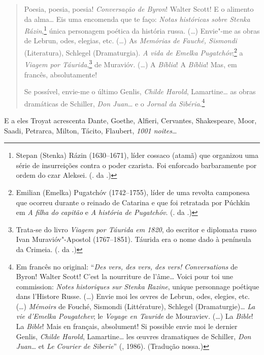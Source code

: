 \begin{quotation}
Poesia, poesia, poesia! \emph{Conversação de Byron}! Walter Scott! E o alimento da alma\ldots{} Eis uma encomenda que te faço: \emph{Notas históricas sobre Stenka Rázin},\footnote{Stepan (Stenka) Rázin (1630--1671), líder cossaco (atamã) que organizou uma série de insurreições contra o poder czarista. Foi enforcado barbaramente por ordem do czar Aleksei. (. da .)} única personagem poética da história russa. (\ldots{}) Envie"-me as obras de Lebrun, odes, elegias, etc. (\ldots{}) As \emph{Memórias de Fauché, Sismondi} (Literatura), Schlegel (Dramaturgia). \emph{A vida de Emelka Pugatchóv};\footnote{Emilian (Emelka) Pugatchóv (1742--1755), líder de uma revolta camponesa que ocorreu durante o reinado de Catarina  e que foi retratada por Púchkin em \emph{A filha do capitão} e \emph{A história de Pugatchóv}. (. da .)} a \emph{Viagem por Táurida},\footnote{Trata-se do livro \emph{Viagem por Táurida em 1820}, do escritor e diplomata russo Ivan Muravióv"-Apostol (1767--1851). Táurida era o nome dado à península da Crimeia. (. da .)} de Muravióv. (\ldots{}) A \emph{Bíblia}! A \emph{Bíblia}! Mas, em francês, absolutamente!

Se possível, envie-me o último Genlis, \emph{Childe Harold}, Lamartine\ldots{} as obras dramáticas de Schiller, \emph{Don Juan}\ldots{} e o \emph{Jornal da Sibéria}.\footnote{Em francês no original: ``\emph{Des vers, des vers, des vers!} \emph{Conversations} de Byron! Walter Scott! C'est la nourriture de l'âme\ldots{} Voici pour toi une commission: \emph{Notes historiques sur Stenka Razine}, unique personnage poétique dans l'Histore Russe. (\ldots{}) Envie moi les œvres de Lebrun, odes, elegies, etc. (\ldots{}) \emph{Mémoirs} de Fouché, Sismondi (Littérature), Schlegel (Dramaturgie)\ldots{} \emph{La vie d'Emelka Pougatchev}; le \emph{Voyage en Tauride} de Mouraviev. (\ldots{}) La \emph{Bible}! La \emph{Bible}! Mais en français, absolument! Si possible envie moi le dernier Genlis, \emph{Childe Harold}, Lamartine\ldots{} les œuvres dramatiques de Schiller, \emph{Don Juan}\ldots{} et \emph{Le Courier de Siberie}'' (, 1986). (Tradução nossa.)}
\end{quotation}

E a eles Troyat acrescenta Dante, Goethe, Alfieri, Cervantes,
Shakespeare, Moor, Saadi, Petrarca, Milton, Tácito, Flaubert, \emph{1001
noites}\ldots{}

